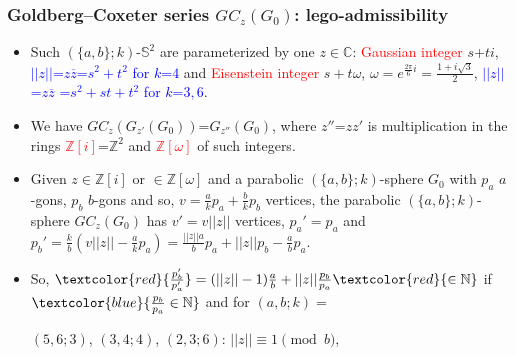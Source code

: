 \documentclass{beamer}
\begin{document}
\begin{frame}\frametitle{Goldberg--Coxeter series $GC_z(G_0)$: lego-admissibility}
\vspace{-4mm}

\begin{itemize}
\item 
Such $(\{a,b\}; k)$-$\mathbb{S}^2$ are  parameterized by one $z\in \mathbb{C}$:
 \textcolor{red}{Gaussian integer} $s$+$ti$,
\textcolor{blue}{$||z||$=$z\overline{z}$=$s^2+t^2$
   for $k$=$4$} and \textcolor{red}{Eisenstein integer} $s+t\omega$,  $\omega=e^{\frac{2\pi}{6} i}=\frac{1+i\sqrt{3}}{2}$,
\textcolor{blue}{$||z||$=$z\overline{z}$
=$s^2+st+t^2$   
 for $k$=$3,6$}.
 \item We have
 $GC_z(G_{z'}(G_0))$=$G_{z''}(G_0)$, where $z''$=$zz'$
 is  multiplication  in the rings \textcolor{red}{$\mathbb{Z}[i]$}=$\mathbb{Z}^2$ and  
\textcolor{red}{$\mathbb{Z}[\omega]$}
 of such integers. 
   


\item 
Given $z\in \mathbb{Z}[i]$ or $\in \mathbb{Z}[\omega]$ and 
a parabolic $(\{a,b\}; k)$-sphere $G_0$ with $p_a$ $a$-gons, $p_b$ $b$-gons and so, 
$v=\frac{a}{k}p_a+\frac{b}{k}p_b$ vertices,
the parabolic $(\{a,b\}; k)$-sphere $GC_z(G_0)$ has $v'=v||z||$ vertices, $p_a'=p_a$ 
and
$p_b'=\frac{k}{b}(v||z||-\frac{a}{k}p_a)=\frac{||z||a}{b}p_a+||z||p_b-\frac{a}{b}p_a$.
\item
So, $ \textcolor{red}{\frac{p_b'}{p_a'}}=(||z||-1) 
\frac{a}{b}
+||z||
 \frac{p_b}{p_a}
  \textcolor{red}{\in  \mathbb{N}}$ if $
  \textcolor{blue}{ 
 \frac{p_b}{p_a}\in \mathbb{N}}$ and for $(a,b;k)=$
 
 $(5,6;3)$, $(3,4;4)$, $(2,3;6)$:     $||z||\equiv 1\pmod b$,
 

\end{itemize}
\end{frame}
\end{document}
